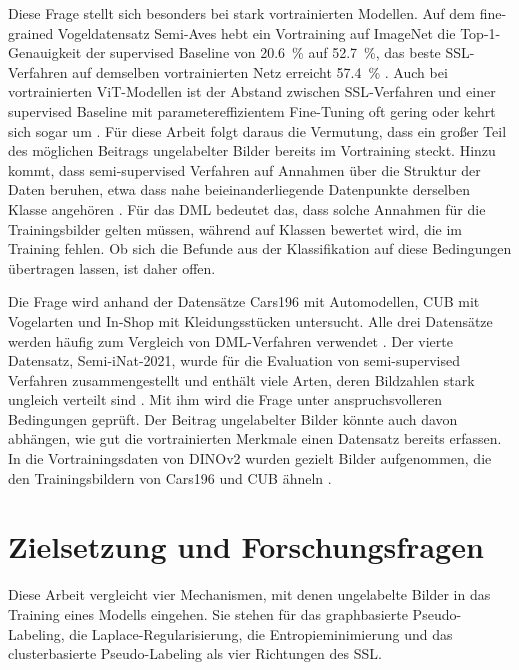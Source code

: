 Diese Frage stellt sich besonders bei stark vortrainierten Modellen. Auf dem fine-grained Vogeldatensatz Semi-Aves hebt ein Vortraining auf ImageNet die Top-1-Genauigkeit der supervised Baseline von \qty{20.6}{\percent} auf \qty{52.7}{\percent}, das beste \ac{SSL}-Verfahren auf demselben vortrainierten Netz erreicht \qty{57.4}{\percent} \cite{su_realistic_2021}. Auch bei vortrainierten \ac{ViT}-Modellen ist der Abstand zwischen \ac{SSL}-Verfahren und einer supervised Baseline mit parametereffizientem Fine-Tuning oft gering oder kehrt sich sogar um \cite{zhang_revisiting_2025}. Für diese Arbeit folgt daraus die Vermutung, dass ein großer Teil des möglichen Beitrags ungelabelter Bilder bereits im Vortraining steckt. Hinzu kommt, dass semi-supervised Verfahren auf Annahmen über die Struktur der Daten beruhen, etwa dass nahe beieinanderliegende Datenpunkte derselben Klasse angehören \cite{van_engelen_survey_2019}. Für das \ac{DML} bedeutet das, dass solche Annahmen für die Trainingsbilder gelten müssen, während auf Klassen bewertet wird, die im Training fehlen. Ob sich die Befunde aus der Klassifikation auf diese Bedingungen übertragen lassen, ist daher offen.

Die Frage wird anhand der Datensätze Cars196 mit Automodellen, \ac{CUB} mit Vogelarten und In-Shop mit Kleidungsstücken untersucht. Alle drei Datensätze werden häufig zum Vergleich von \ac{DML}-Verfahren verwendet \cite{song_deep_2016, musgrave_metric_2020, wang_multi-similarity_2019, kim_proxy_2020}. Der vierte Datensatz, Semi-iNat-2021, wurde für die Evaluation von semi-supervised Verfahren zusammengestellt und enthält viele Arten, deren Bildzahlen stark ungleich verteilt sind \cite{su_semi-supervised_inat_2021}. Mit ihm wird die Frage unter anspruchsvolleren Bedingungen geprüft. Der Beitrag ungelabelter Bilder könnte auch davon abhängen, wie gut die vortrainierten Merkmale einen Datensatz bereits erfassen. In die Vortrainingsdaten von DINOv2 wurden gezielt Bilder aufgenommen, die den Trainingsbildern von Cars196 und \ac{CUB} ähneln \cite{oquab_dinov2_2023}.

\section{Zielsetzung und Forschungsfragen}

Diese Arbeit vergleicht vier Mechanismen, mit denen ungelabelte Bilder in das Training eines Modells eingehen. Sie stehen für das graphbasierte Pseudo-Labeling, die Laplace-Regularisierung, die Entropieminimierung und das clusterbasierte Pseudo-Labeling als vier Richtungen des \ac{SSL}.

